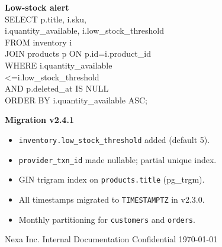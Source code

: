 \vspace{2pt}

\begin{minipage}{0.48\textwidth}
  \begin{tcolorbox}[colback=bglight,colframe=accent!40,sharp corners,boxrule=0.3pt,
    left=2mm,right=2mm,top=1.5mm,bottom=1.5mm,before skip=1pt,after skip=0pt]
    {\fontsize{6.5}{8}\selectfont\color{primary}\textbf{Low-stock alert}}\\[0.5pt]
    {\fontsize{5.5}{7}\selectfont\ttfamily
      SELECT p.title, i.sku,\\
      \quad i.quantity\_available, i.low\_stock\_threshold\\
      \quad FROM inventory i\\
      \quad JOIN products p ON p.id=i.product\_id\\
      \quad WHERE i.quantity\_available\\
      \qquad <=i.low\_stock\_threshold\\
      \qquad AND p.deleted\_at IS NULL\\
      \quad ORDER BY i.quantity\_available ASC;
    }
  \end{tcolorbox}
\end{minipage}
\par
\begin{minipage}{0.48\textwidth}
  \begin{tcolorbox}[colback=secondary!6,colframe=secondary!50,sharp corners,boxrule=0.4pt,
    left=2mm,right=2mm,top=1.5mm,bottom=1.5mm,before skip=1pt,after skip=0pt]
    {\fontsize{6.5}{8}\selectfont\color{primary}\textbf{Migration v2.4.1}}
    \begin{itemize}
      \item \texttt{inventory.low\_stock\_threshold} added (default 5).
      \item \texttt{provider\_txn\_id} made nullable; partial unique index.
      \item GIN trigram index on \texttt{products.title} (pg\_trgm).
      \item All timestamps migrated to \texttt{TIMESTAMPTZ} in v2.3.0.
      \item Monthly partitioning for \texttt{customers} and \texttt{orders}.
    \end{itemize}
  \end{tcolorbox}
\end{minipage}
\par

\vfill
\begin{center}
  {\fontsize{6.5}{8}\selectfont\color{accent}
    Nexa Inc. \textbar{} Internal Documentation \textbar{} Confidential \textbar{} \today
  }
\end{center}
